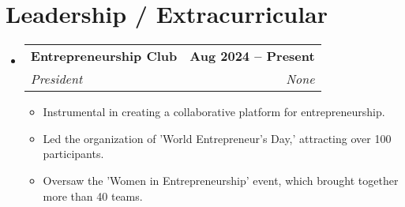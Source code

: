 \documentclass[letterpaper,11pt]{article}
\makeatletter
\newcommand{\resumeItem}[1]{
  \item\small{
    {#1 \vspace{-2pt}}
  }
}
\newcommand{\resumeSubheading}[4]{
  \vspace{-2pt}\item
    \begin{tabular*}{1.0\textwidth}[t]{l@{\extracolsep{\fill}}r}
      \textbf{#1} & \textbf{\small #2} \\
      \textit{\small#3} & \textit{\small #4} \\
    \end{tabular*}\vspace{-7pt}
}
\newcommand{\resumeSubHeadingListStart}{\begin{itemize}[leftmargin=0.0in, label={}]}
\newcommand{\resumeSubHeadingListEnd}{\end{itemize}}
\newcommand{\resumeItemListStart}{\begin{itemize}}
\newcommand{\resumeItemListEnd}{\end{itemize}\vspace{-5pt}}
\makeatother
\begin{document}
\section{Leadership / Extracurricular}
    \resumeSubHeadingListStart
        \resumeSubheading{Entrepreneurship Club}{Aug 2024 -- Present}{President}{None}
            \resumeItemListStart
                \resumeItem{Instrumental in creating a collaborative platform for entrepreneurship.}
                \resumeItem{Led the organization of 'World Entrepreneur's Day,' attracting over 100 participants.}
                \resumeItem{Oversaw the 'Women in Entrepreneurship' event, which brought together more than 40 teams.}
            \resumeItemListEnd
    \resumeSubHeadingListEnd
\end{document}
